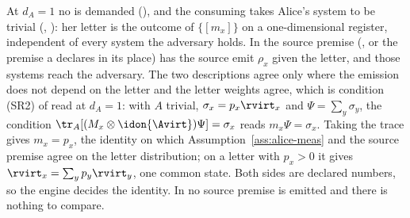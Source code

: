 
At $d_A=1$ no  is demanded
(), and the consuming  takes Alice's
system to be trivial (,
): her letter is the outcome of $\{[m_x]\}$ on
a one-dimensional register, independent of every system the adversary holds.
In  the source premise
(, or the premise a  declares in
its place) has the source emit $\rho_x$ given the letter, and those systems
reach the adversary. The two descriptions agree only where the emission does
not depend on the letter and the letter weights agree, which is condition
(SR2) of  read at $d_A=1$: with $A$ trivial,
$\sigma_x=p_x\rvirt_x$ and $\Psi=\sum_y\sigma_y$, the condition
$\tr_A[(M_x\otimes\idon{\Avirt})\Psi]=\sigma_x$ reads $m_x\Psi=\sigma_x$.
Taking the trace gives $m_x=p_x$, the identity on which
Assumption~\ref{ass:alice-meas} and the source premise agree on the letter
distribution; on a letter with $p_x>0$ it gives $\rvirt_x=\sum_yp_y\rvirt_y$,
one common state. Both sides are declared numbers, so the engine decides the
identity. In  no source premise is emitted and
there is nothing to compare.

